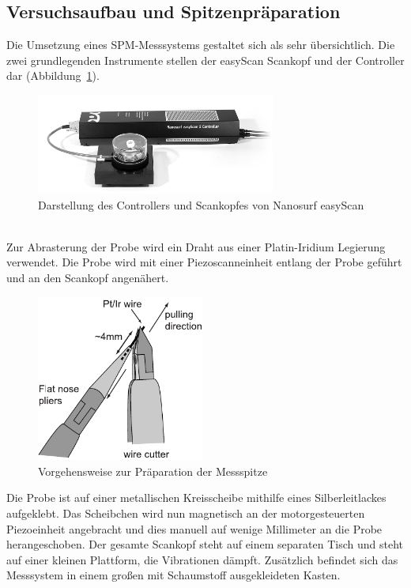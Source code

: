 \documentclass[a4paper,twoside,final]{article}
\begin{document}
\subsection{Versuchsaufbau und Spitzenpräparation}
Die Umsetzung eines SPM-Messsystems gestaltet sich als sehr übersichtlich. Die zwei grundlegenden Instrumente stellen der easyScan Scankopf und der Controller dar (Abbildung~\ref{fig:Messsystem}).\\
\begin{figure}[htp]
  \vspace{-5mm}
    \centering
    \includegraphics[width=0.7\textwidth]{Bilder/EasyScanSystem.pdf}
    \caption{Darstellung des Controllers und Scankopfes von Nanosurf easyScan}
    \label{fig:Messsystem}
\end{figure}\\
Zur Abrasterung der Probe wird ein Draht aus einer Platin-Iridium Legierung verwendet. Die Probe wird mit einer Piezoscanneinheit entlang der Probe geführt und an den Scankopf angenähert.
\begin{figure}
  \centering
  \vspace{-5mm}
  \includegraphics[width=5.5cm]{Bilder/WireCutter.pdf}
  \caption{Vorgehensweise zur Präparation der Messspitze}
  \label{fig:Spitzenpräparation}
\end{figure}
Die Probe ist auf einer metallischen Kreisscheibe mithilfe eines Silberleitlackes aufgeklebt. Das Scheibchen wird nun magnetisch an der motorgesteuerten Piezoeinheit angebracht und dies manuell auf wenige Millimeter an die Probe herangeschoben.
Der gesamte Scankopf steht auf einem separaten Tisch und steht auf einer kleinen Plattform, die Vibrationen dämpft. Zusätzlich befindet sich das Messsystem in einem großen mit Schaumstoff ausgekleideten Kasten.\\
\end{document}

